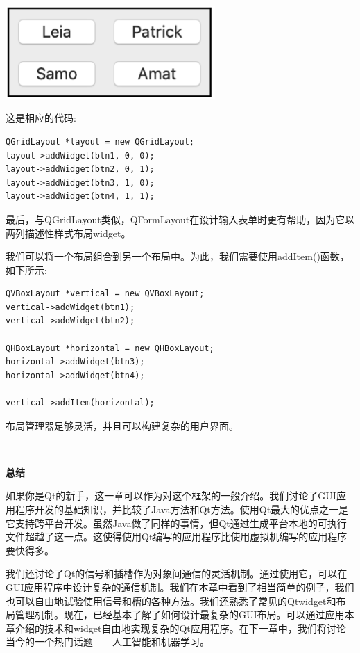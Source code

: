 \begin{center}
	\includegraphics[width=0.6\textwidth]{content/Section-2/Chapter-14/18}
\end{center}

这是相应的代码: \par

\begin{lstlisting}[caption={}]
QGridLayout *layout = new QGridLayout;
layout->addWidget(btn1, 0, 0);
layout->addWidget(btn2, 0, 1);
layout->addWidget(btn3, 1, 0);
layout->addWidget(btn4, 1, 1);
\end{lstlisting}

最后，与QGridLayout类似，QFormLayout在设计输入表单时更有帮助，因为它以两列描述性样式布局widget。 \par
我们可以将一个布局组合到另一个布局中。为此，我们需要使用addItem()函数，如下所示: \par

\begin{lstlisting}[caption={}]
QVBoxLayout *vertical = new QVBoxLayout;
vertical->addWidget(btn1);
vertical->addWidget(btn2);

QHBoxLayout *horizontal = new QHBoxLayout;
horizontal->addWidget(btn3);
horizontal->addWidget(btn4);

vertical->addItem(horizontal);
\end{lstlisting}

布局管理器足够灵活，并且可以构建复杂的用户界面。 \par

\noindent\textbf{}\ \par
\textbf{总结} \ \par
如果你是Qt的新手，这一章可以作为对这个框架的一般介绍。我们讨论了GUI应用程序开发的基础知识，并比较了Java方法和Qt方法。使用Qt最大的优点之一是它支持跨平台开发。虽然Java做了同样的事情，但Qt通过生成平台本地的可执行文件超越了这一点。这使得使用Qt编写的应用程序比使用虚拟机编写的应用程序要快得多。 \par
我们还讨论了Qt的信号和插槽作为对象间通信的灵活机制。通过使用它，可以在GUI应用程序中设计复杂的通信机制。我们在本章中看到了相当简单的例子，我们也可以自由地试验使用信号和槽的各种方法。我们还熟悉了常见的Qtwidget和布局管理机制。现在，已经基本了解了如何设计最复杂的GUI布局。可以通过应用本章介绍的技术和widget自由地实现复杂的Qt应用程序。在下一章中，我们将讨论当今的一个热门话题——人工智能和机器学习。 \par

